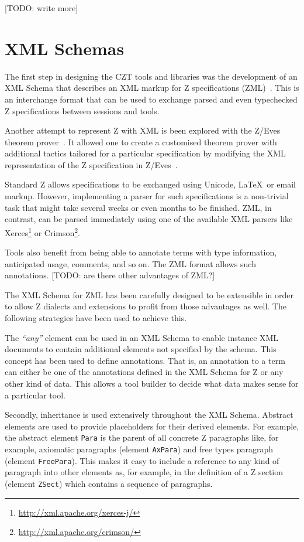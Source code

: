 \documentclass{llncs}
\newcommand{\Element}[1]{\texttt{#1}}
\begin{document}
  [TODO: write more]

\section{XML Schemas}

  The first step in designing the CZT tools and libraries was the
  development of an XML Schema that describes an XML markup for Z
  specifications (ZML)~\cite{UttEA:03}.  This is an interchange format
  that can be used to exchange parsed and even typechecked Z
  specifications between sessions and tools.

  Another attempt to represent Z with XML is been explored with the
  Z/Eves theorem prover~\cite{tp.tools:zeves.ref}. It allowed one to
  create a customised theorem prover with additional tactics tailored
  for a particular specification by modifying the XML representation
  of the Z specification in Z/Eves~\cite{tp.tools:zeves.api}.

  Standard Z allows specifications to be exchanged using Unicode,
  \LaTeX\ or email markup.  However, implementing a parser for such
  specifications is a non-trivial task that might take several weeks
  or even months to be finished.  ZML, in contrast, can be parsed
  immediately using one of the available XML parsers like
  Xerces\footnote{\url{http://xml.apache.org/xerces-j/}} or
  Crimson\footnote{\url{http://xml.apache.org/crimson/}}.

  Tools also benefit from being able to annotate terms with type
  information, anticipated usage, comments, and so on.  The ZML format
  allows such annotations. [TODO: are there other advantages of ZML?]

  The XML Schema for ZML has been carefully designed to be extensible
  in order to allow Z dialects and extensions to profit from those
  advantages as well.  The following strategies have been used to
  achieve this.

  The \textit{``any''} element can be used in an XML Schema to enable
  instance XML documents to contain additional elements not specified
  by the schema.  This concept has been used to define annotations.
  That is, an annotation to a term can either be one of the
  annotations defined in the XML Schema for Z or any other kind of
  data.  This allows a tool builder to decide what data makes sense
  for a particular tool.

  Secondly, inheritance is used extensively throughout the XML Schema.
  Abstract elements are used to provide placeholders for their derived
  elements.  For example, the abstract element \Element{Para} is the
  parent of all concrete Z paragraphs like, for example, axiomatic
  paragraphs (element \Element{AxPara}) and free types paragraph
  (element \Element{FreePara}).  This makes it easy to include a
  reference to any kind of paragraph into other elements as, for
  example, in the definition of a Z section (element \Element{ZSect})
  which contains a sequence of paragraphs.
\end{document}
